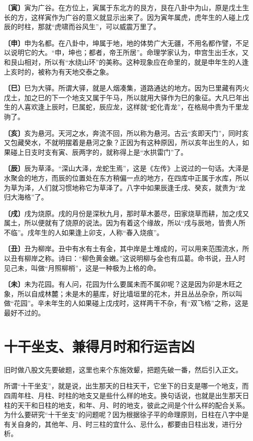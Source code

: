 \documentclass[a5paper,oneside,12pt]{ctexbook}
\begin{document}
\textbf{〔寅〕}寅为广谷。在方位上，寅属于东北方的艮方，艮在八卦中为山，原是戊土生长的方，这样寅作为广谷的意义就显示出来了。因为寅年属虎，虎年生的人碰上戊辰的时柱，那就“虎啸而谷风生”，可以威震万里了。

\textbf{〔申〕}申为名都。在八卦中，坤属于地，地的体势广大无疆，不用名都作譬，不足以说明它的大。“申，坤也；都者，帝王所居”。命理学家认为，申宫生出壬水，又和艮山相对，所以有“水绕山环”的美称。这种现象应在命里的，就是申年生的人逢上亥时的，被称为有天地交泰之象。

\textbf{〔巳〕}巳为大驿。所谓大驿，就是人烟凑集，道路通达的地方。因为巳里藏有丙火戊土，加之巳的下一个地支又属于午马，所以就用大驿作为巳的象征。大凡巳年出生的人喜欢逢上辰时，巳属蛇，辰应龙，这样就“蛇化青龙”，在格局中贵为千里龙驹了。

\textbf{〔亥〕}亥为悬河。天河之水，奔流不回，所以称为悬河。古云“亥即天门”，同时亥又包藏癸水，不就明摆着是悬河之象？正因为有这种原因，所以亥年出生的人，如果碰上日支时支有寅、辰两字的，就称得上是“水拱雷门”了。

\textbf{〔辰〕}辰为草泽。“深山大泽，龙蛇生焉”，这是《左传》上说过的一句话。大泽是水聚会的地方，而辰的位置处在东方稍偏一点的地方，在四库中正属于水库，所以为草为泽，人们就习惯地称它为草泽了。八字中如果辰逢壬戌、癸亥，就贵为“龙归大海格”了。

\textbf{〔戌〕}戌为烧原。戌的月份是深秋九月，那时草木萎尽，田家烧草而耕，加之戌又属土，所以便就有了烧原的说法。因为有着这个缘故，所以“戌与辰地，皆贵人所不临”。戌年生的人如果逢上卯支，人称“春入烧痕”。

\textbf{〔丑〕}丑为柳岸。丑中有水有土有金，其中岸是土堆成的，可以用来范围流水，所以丑有柳岸之称。诗曰：“柳色黄金嫩。”这说明柳与金也有瓜葛。命书说，丑人时见己未，叫做“月照柳梢”，这是一种极为上格的命。

\textbf{〔未〕}未为花园。有人问，花园为什么要属未而不属卯呢？这是因为卯是木旺之象，所以自成林麓；未是木的墓库，好比墙垣里的花木，并且丛丛杂杂，所以叫做“花园”。辛未年生的人如果碰上戊戌时，这样两干不杂，有“双飞格”之称，这是最好不过的。


\section{十干坐支、兼得月时和行运吉凶}
旧时做八股文先要破题，这里也来个东施效颦，把题先破一番，然后引入正文。

所谓“十干坐支”，就是说，出生那天的日柱天干，它坐下的日支是哪一个地支，而四周年柱、月柱、时柱的地支又是些什么样的地支。换句话说，也就是出生那天日柱的天干和日柱的地支，和年、月、时的地支，彼此之间是个什么样的配合关系。为什么要研究“十干坐支”的问题呢？因为根据徐子平的命理原则，日柱在八字中是有关自身的，其他年、月、时三柱的宜什么、忌什么，都要由日柱出发，进行分析。
\end{document}
